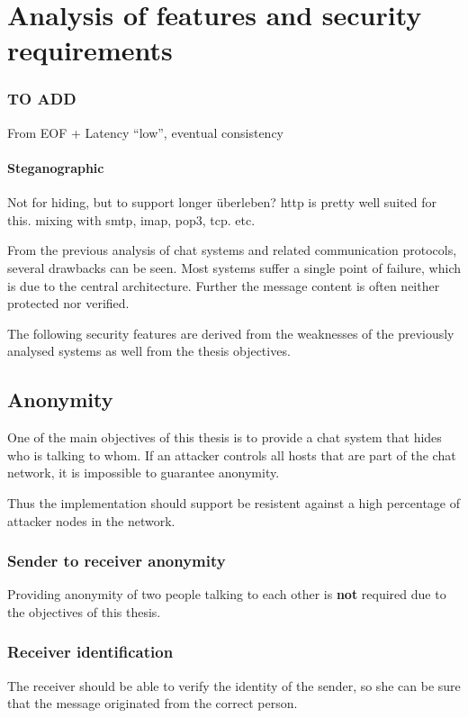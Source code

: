 \chapter{Analysis of features and security requirements}
\label{requirements}

\subsection{TO ADD}
From EOF + Latency "`low"', eventual consistency

\subsubsection{Steganographic}
Not for hiding, but to support longer überleben?
http is pretty well suited for this.
mixing with smtp, imap, pop3, tcp. etc.


From the previous analysis of chat systems and related communication protocols,
several drawbacks can be seen. Most systems suffer a single point of failure,
which is due to the central architecture. Further the message content is often
neither protected nor verified.

The following security features are derived from the weaknesses of the previously
analysed systems as well from the thesis objectives.
\section{Anonymity}
One of the main objectives of this thesis is to provide a chat system that
hides who is talking to whom. If an attacker controls all hosts that are
part of the chat network, it is impossible to guarantee anonymity.

Thus the implementation should support be resistent against a high percentage
of attacker nodes in the network.
\subsection{Sender to receiver anonymity}
Providing anonymity of two people talking to each other is \textbf{not} 
required due to the objectives of this thesis.
\subsection{Receiver identification}
The receiver should be able to verify the identity of the sender, so she
can be sure that the message originated from the correct person.
